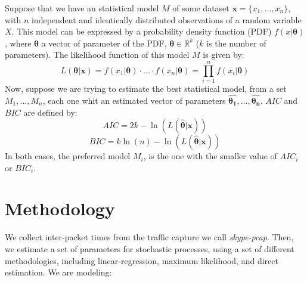 Suppose that we have an statistical model $M$ of some dataset ${\boldsymbol{x} = \{x_1, ..., x_n}\}$, with $n$ independent and identically distributed observations of a random variable $X$. This model can be expressed by a probability density function (PDF) $f(x| \boldsymbol{\theta})$, where $\boldsymbol{\theta}$ a vector of parameter of the PDF, $\boldsymbol{\theta} \in \mathbb{R}^{k}$ ($k$ is the number of parameters). The  likelihood function  of this model $M$ is given by:
\begin{equation}
L(\boldsymbol{\theta}|\boldsymbol{x} ) =  f(x_1|\boldsymbol{\theta})\cdot...\cdot f(x_n|\boldsymbol{\theta}) = \prod_{i = 1}^{n}f(x_i|\boldsymbol{\theta})
\end{equation}
Now, suppose we are trying to estimate the best statistical model, from a set ${M_1, ..., M_n}$, each one whit an estimated vector of parameters  ${\boldsymbol{\hat{\theta_1}}}, ..., {\boldsymbol{\hat{\theta_n}}}$. $AIC$ and $BIC$ are defined by:
\begin{equation}
AIC = 2k - \ln(L(\boldsymbol{\hat{\theta}}|\boldsymbol{x}))
\end{equation}
\begin{equation}
BIC = k\ln(n) - \ln(L(\boldsymbol{\hat{\theta}}|\boldsymbol{x}))
\end{equation}
In both cases, the preferred model $M_i$, is the one with the smaller value of $AIC_i$ or $BIC_i$.

\section{Methodology}

We collect inter-packet times from the traffic capture we call \textit{skype-pcap}. Then, we estimate a set of parameters for stochastic processes, using a set of different methodologies, including linear-regression, maximum likelihood, and direct estimation. We are modeling: 

